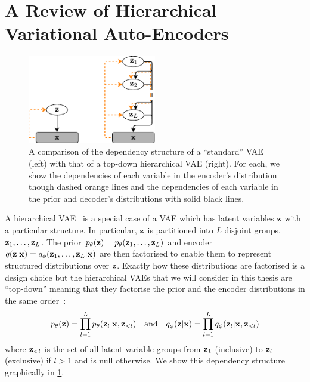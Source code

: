 \section{A Review of Hierarchical Variational Auto-Encoders}
\label{sec:hierarchical-vae}
\begin{figure}
    \centering
    \includegraphics[width=0.5\textwidth]{figs/thesis/vae-vs-hierarchical-vae.pdf}
    \caption{A comparison of the dependency structure of a ``standard'' VAE (left) with that of a top-down hierarchical VAE (right). For each, we show the dependencies of each variable in the encoder's distribution though dashed orange lines and the dependencies of each variable in the prior and decoder's distributions with solid black lines.}
    \label{fig:vae-vs-hierarchical-vae}
\end{figure}
A hierarchical VAE~\citep{gregor2015draw,kingma2016improving,sonderby2016ladder,klushyn2019learning} is a special case of a VAE which has latent variables ${\mathbf{z}}$ with a particular structure. In particular, ${\mathbf{z}}$ is partitioned into $L$ disjoint groups, ${\mathbf{z}}_1,\ldots,{\mathbf{z}}_L$. The prior $p_\theta({\mathbf{z}}) = p_\theta({\mathbf{z}}_1,\ldots,{\mathbf{z}}_L)$ and encoder $q({\mathbf{z}}|{\mathbf{x}}) = q_\phi({\mathbf{z}}_1,\ldots,{\mathbf{z}}_L|{\mathbf{x}})$ are then factorised to enable them to represent structured distributions over ${\mathbf{z}}$. Exactly how these distributions are factorised is a design choice but the hierarchical VAEs that we will consider in this thesis are ``top-down'' meaning that they factorise the prior and the encoder distributions in the same order~\citep{vahdat2020nvae,child2020very}:
\begin{equation}
    p_\theta({\mathbf{z}}) = \prod_{l=1}^L p_\theta({\mathbf{z}}_l|{\mathbf{x}},{\mathbf{z}}_{<l}) \quad \text{and} \quad q_\phi({\mathbf{z}}|{\mathbf{x}}) = \prod_{l=1}^L q_\phi({\mathbf{z}}_l|{\mathbf{x}},{\mathbf{z}}_{<l})
\end{equation}
where ${\mathbf{z}}_{<l}$ is the set of all latent variable groups from ${\mathbf{z}}_1$ (inclusive) to ${\mathbf{z}}_{l}$ (exclusive) if $l > 1$ and is null otherwise. We show this dependency structure graphically in \cref{fig:vae-vs-hierarchical-vae}.

